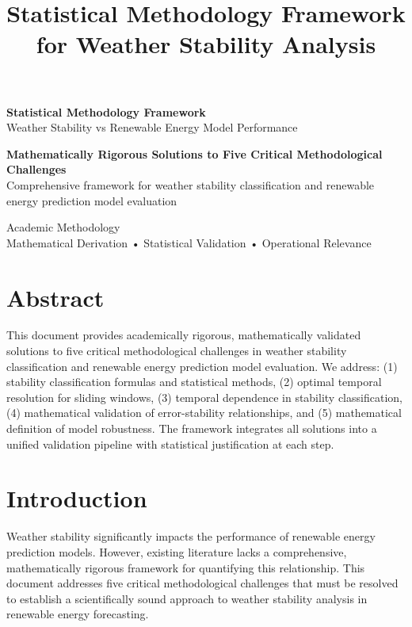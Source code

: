 \documentclass[11pt,a4paper]{article}
\title{\textbf{\color{primaryblue}Statistical Methodology Framework for Weather Stability Analysis}}
\author{}
\date{}
\begin{document}
\begin{titlepage}
\centering
\vspace*{2cm}

{\Huge\bfseries\color{primaryblue}Statistical Methodology Framework}\\[0.5cm]
{\Large\color{secondaryblue}Weather Stability vs Renewable Energy Model Performance}\\[2cm]

\begin{tcolorbox}[colback=lightgray,colframe=primaryblue,boxrule=2pt,arc=5pt,width=0.8\textwidth]
\centering
\large\textbf{Mathematically Rigorous Solutions to Five Critical Methodological Challenges}\\[0.3cm]
\small Comprehensive framework for weather stability classification and renewable energy prediction model evaluation
\end{tcolorbox}

\vspace{2cm}

\vfill
{\large\color{darkgray}Academic Methodology}\\[0.2cm]
{\small\color{darkgray}Mathematical Derivation • Statistical Validation • Operational Relevance}
\end{titlepage}

\newpage
\tableofcontents
\newpage

\section{Abstract}

This document provides academically rigorous, mathematically validated solutions to five critical methodological challenges in weather stability classification and renewable energy prediction model evaluation. We address: (1) stability classification formulas and statistical methods, (2) optimal temporal resolution for sliding windows, (3) temporal dependence in stability classification, (4) mathematical validation of error-stability relationships, and (5) mathematical definition of model robustness. The framework integrates all solutions into a unified validation pipeline with statistical justification at each step.

\section{Introduction}

Weather stability significantly impacts the performance of renewable energy prediction models. However, existing literature lacks a comprehensive, mathematically rigorous framework for quantifying this relationship. This document addresses five critical methodological challenges that must be resolved to establish a scientifically sound approach to weather stability analysis in renewable energy forecasting.
\end{document}
